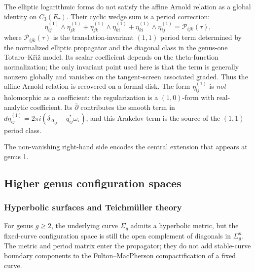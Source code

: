 \begin{proposition}
\label{prop:elliptic-arnold-relations}
The elliptic logarithmic forms do not satisfy the affine Arnold
relation as a global identity on $C_3(E_\tau)$. Their cyclic wedge sum
is a period correction:
\[
\eta_{ij}^{(1)} \wedge \eta_{jk}^{(1)}
+ \eta_{jk}^{(1)} \wedge \eta_{ki}^{(1)}
+ \eta_{ki}^{(1)} \wedge \eta_{ij}^{(1)}
= \mathcal P_{ijk}(\tau),
\]
where $\mathcal P_{ijk}(\tau)$ is the translation-invariant
$(1,1)$ period term determined by the normalized elliptic propagator
and the diagonal class in the genus-one
Totaro--K\v{r}\'{\i}\v{z} model. Its scalar coefficient depends on the
theta-function normalization; the only invariant point used here is
that the term is generally nonzero globally and vanishes on the
tangent-screen associated graded. Thus the affine Arnold relation is
recovered on a formal disk. The form $\eta_{ij}^{(1)}$ is \emph{not}
holomorphic as a coefficient: the regularization is a $(1,0)$-form
with real-analytic coefficient. Its $\bar\partial$ contributes the
smooth term in
$d\eta_{ij}^{(1)}=2\pi i(\delta_{\Delta_{ij}}-q_{ij}^{*}\omega_\tau)$,
and this Arakelov term is the source of the $(1,1)$ period class.
\end{proposition}

The non-vanishing right-hand side encodes the central extension that appears at genus 1.

\subsection{Higher genus configuration spaces}

\subsubsection{Hyperbolic surfaces and Teichmüller theory}

For genus $g \geq 2$, the underlying curve $\Sigma_g$ admits a
hyperbolic metric, but the fixed-curve configuration space is still the
open complement of diagonals in $\Sigma_g^n$. The metric and period
matrix enter the propagator; they do not add stable-curve boundary
components to the Fulton--MacPherson compactification of a fixed curve.

